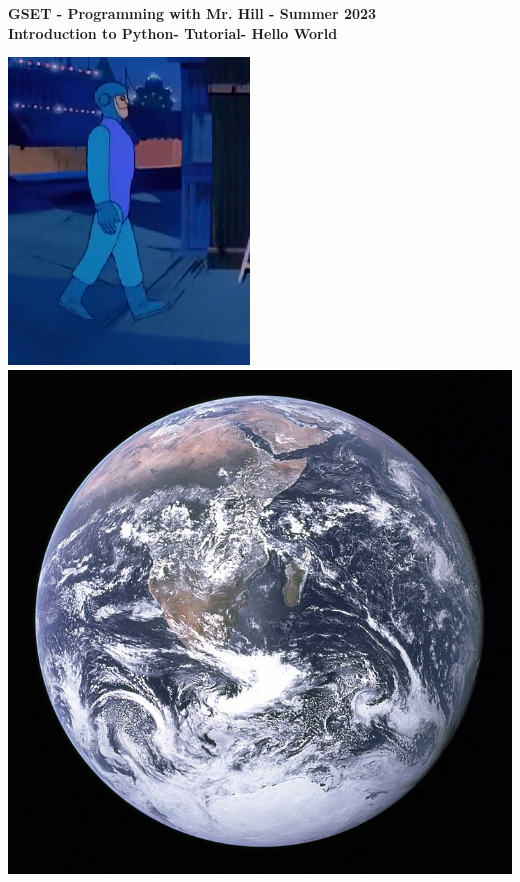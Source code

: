 \documentclass[12pt]{article}
\newcommand{\MNUM}{0} %
\newcommand{\MNAME}{Introduction to Python} %
\newcommand{\TNAME}{Hello World} %
\begin{document}
\thispagestyle{plain}

\begin{center}
   {\bf \large GSET - Programming with Mr. Hill - Summer 2023} \vspace{5mm}\\
   {\bf \Large \MNAME \hspc -  Tutorial\hspc\MNUM\hspc - \TNAME}\vspace{3mm}\\
   
\end{center}

 \hspace*{3cm}\includegraphics[scale=.6]{charlie_robot_sideview.png} \hspace*{1cm}\includegraphics[scale=.18]{blue_marble.jpg}
\end{document}
